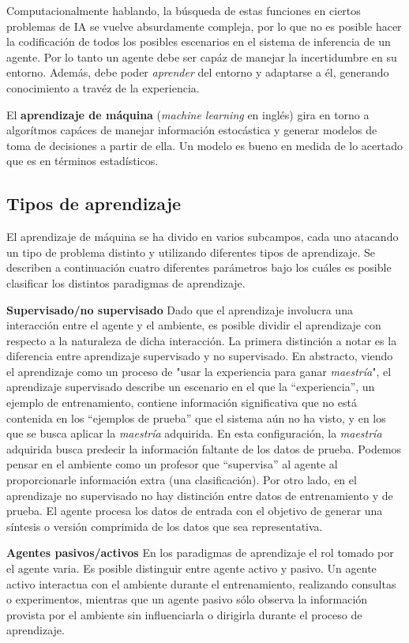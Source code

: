 Computacionalmente hablando, la búsqueda de estas funciones en ciertos problemas de IA 
se vuelve absurdamente compleja, por lo que no es posible hacer la codificación de todos
los posibles escenarios en el sistema de inferencia de un agente. Por lo tanto un agente
debe ser capáz de manejar la incertidumbre en su entorno. Además, debe poder \textit{aprender}
del entorno y adaptarse a él, generando conocimiento a travéz de la experiencia.

El \textbf{aprendizaje de máquina} (\textit{machine learning} en inglés) gira en torno a
algorítmos capáces de manejar información estocástica y generar modelos de toma de decisiones
a partir de ella. Un modelo es bueno en medida de lo acertado que es en términos estadísticos.

\subsection{Tipos de aprendizaje}
El aprendizaje de máquina se ha divido en varios subcampos,
cada uno atacando un tipo de problema distinto y utilizando diferentes
tipos de aprendizaje.
Se describen a continuación cuatro diferentes parámetros bajo los cuáles
es posible clasificar los distintos paradigmas de aprendizaje.

\textbf{Supervisado/no supervisado} Dado que el aprendizaje involucra
una interacción entre el agente y el ambiente, es posible
dividir el aprendizaje con respecto a la naturaleza de dicha interacción.
La primera distinción a notar es la diferencia entre aprendizaje supervisado
y no supervisado. En abstracto, viendo el aprendizaje como un proceso
de "usar la experiencia para ganar \textit{maestría}", el aprendizaje
supervisado describe un escenario en el que la ``experiencia'', un
ejemplo de entrenamiento, contiene información significativa que no
está contenida en los ``ejemplos de prueba'' que el sistema aún no ha
visto, y en los que se busca aplicar la \textit{maestría} adquirida.
En esta configuración, la \textit{maestría} adquirida busca
predecir la información faltante de los datos de prueba. Podemos
pensar en el ambiente como un profesor que ``supervisa'' al agente
al proporcionarle información extra (una clasificación). Por otro lado,
en el aprendizaje no supervisado no hay distinción entre datos de
entrenamiento y de prueba. El agente procesa los datos de entrada
con el objetivo de generar una síntesis o versión comprimida de los
datos que sea representativa.

\textbf{Agentes pasivos/activos} En los paradigmas de aprendizaje
el rol tomado por el agente varia. Es posible distinguir entre
agente activo y pasivo. Un agente activo interactua
con el ambiente durante el entrenamiento, realizando consultas o
experimentos, mientras que un agente pasivo sólo observa la
información provista por el ambiente sin influenciarla
o dirigirla durante el proceso de aprendizaje.

